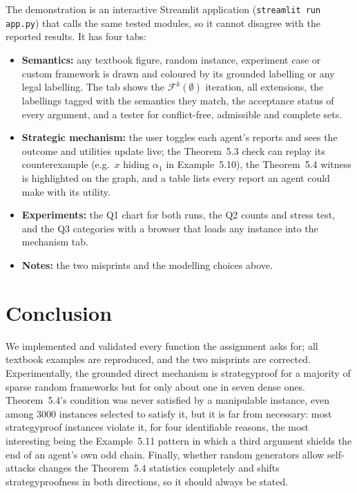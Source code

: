 \documentclass[11pt,a4paper]{article}
\newcommand{\code}[1]{{\let\origus\_\renewcommand{\_}{\origus\allowbreak}\texttt{#1}}}
\theoremstyle{definition}
\begin{document}
The demonstration is an interactive Streamlit application (\code{streamlit run app.py}) that calls the
same tested modules, so it cannot disagree with the reported results. It has four tabs:
\begin{itemize}
  \item \textbf{Semantics:} any textbook figure, random instance, experiment case or custom framework
        is drawn and coloured by its grounded labelling or any legal labelling. The tab shows the
        $\mathcal F^k(\emptyset)$ iteration, all extensions, the labellings tagged with the semantics
        they match, the acceptance status of every argument, and a tester for conflict-free,
        admissible and complete sets.
  \item \textbf{Strategic mechanism:} the user toggles each agent's reports and sees the outcome and
        utilities update live; the Theorem~5.3 check can replay its counterexample (e.g.\ $x$ hiding
        $\alpha_1$ in Example~5.10), the Theorem~5.4 witness is highlighted on the graph, and a table
        lists every report an agent could make with its utility.
  \item \textbf{Experiments:} the Q1 chart for both runs, the Q2 counts and stress test, and the Q3
        categories with a browser that loads any instance into the mechanism tab.
  \item \textbf{Notes:} the two misprints and the modelling choices above.
\end{itemize}

\section{Conclusion}

We implemented and validated every function the assignment asks for; all textbook examples are
reproduced, and the two misprints are corrected. Experimentally, the grounded direct mechanism is
strategyproof for a majority of sparse random frameworks but for only about one in seven dense ones.
Theorem~5.4's condition was never satisfied by a manipulable instance, even among 3000 instances
selected to satisfy it, but it is far from necessary: most strategyproof instances violate it, for
four identifiable reasons, the most interesting being the Example~5.11 pattern in which a third
argument shields the end of an agent's own odd chain. Finally, whether random generators allow
self-attacks changes the Theorem~5.4 statistics completely and shifts strategyproofness in both
directions, so it should always be stated.
\end{document}
